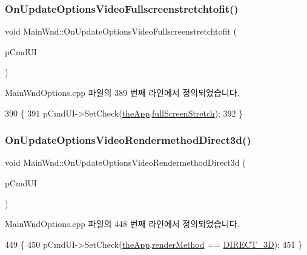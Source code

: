\subsubsection{\texorpdfstring{On\+Update\+Options\+Video\+Fullscreenstretchtofit()}{OnUpdateOptionsVideoFullscreenstretchtofit()}}
{\footnotesize\ttfamily void Main\+Wnd\+::\+On\+Update\+Options\+Video\+Fullscreenstretchtofit (\begin{DoxyParamCaption}\item[{C\+Cmd\+UI $\ast$}]{p\+Cmd\+UI }\end{DoxyParamCaption})\hspace{0.3cm}{\ttfamily [protected]}}



Main\+Wnd\+Options.\+cpp 파일의 389 번째 라인에서 정의되었습니다.


\begin{DoxyCode}
390 \{
391   pCmdUI->SetCheck(\mbox{\hyperlink{_v_b_a_8cpp_a8095a9d06b37a7efe3723f3218ad8fb3}{theApp}}.\mbox{\hyperlink{class_v_b_a_a00bd5b85110bd763ad39eb4a9fb403a1}{fullScreenStretch}});
392 \}
\end{DoxyCode}
\mbox{\label{class_main_wnd_a8779ba5e97c383930dcaa658e6f26438}} 
\subsubsection{\texorpdfstring{On\+Update\+Options\+Video\+Rendermethod\+Direct3d()}{OnUpdateOptionsVideoRendermethodDirect3d()}}
{\footnotesize\ttfamily void Main\+Wnd\+::\+On\+Update\+Options\+Video\+Rendermethod\+Direct3d (\begin{DoxyParamCaption}\item[{C\+Cmd\+UI $\ast$}]{p\+Cmd\+UI }\end{DoxyParamCaption})\hspace{0.3cm}{\ttfamily [protected]}}



Main\+Wnd\+Options.\+cpp 파일의 448 번째 라인에서 정의되었습니다.


\begin{DoxyCode}
449 \{
450   pCmdUI->SetCheck(\mbox{\hyperlink{_v_b_a_8cpp_a8095a9d06b37a7efe3723f3218ad8fb3}{theApp}}.\mbox{\hyperlink{class_v_b_a_ae31026d8986a7658f3aaa46fba9de663}{renderMethod}} == \mbox{\hyperlink{_display_8h_aa50f63b0688d0250e0be64d8401d09a0acff887f7ebbcc7cd915719b8b594a56b}{DIRECT\_3D}});
451 \}
\end{DoxyCode}
\mbox{\label{class_main_wnd_aeb37587c171ba07587e8ae76b18afa61}} 
